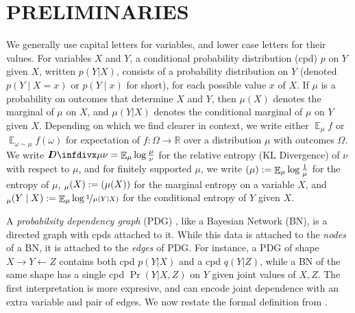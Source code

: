\documentclass[twoside]{article}
\theoremstyle{plain}
\theoremstyle{definition}
\let\H\relax
\DeclareMathOperator{\H}{\mathrm{H}} %
\DeclareMathOperator*{\Ex}{\mathbb{E}} %
\newcommand{\thickD}{I\mkern-8muD}
\newcommand{\kldiv}{\thickD\infdivx}
\newcommand{\ed}[3]{%
		\mathchoice%
		{#2\overset{\smash{\mskip-5mu\raisebox{-3pt}{${#1}$}}}{\xrightarrow{\hphantom{\scriptstyle {#1}}}} #3} %
		{#2\overset{\smash{\mskip-5mu\raisebox{-3pt}{$\scriptstyle {#1}$}}}{\xrightarrow{\hphantom{\scriptstyle {#1}}}} #3}%
		{#2\overset{\smash{\mskip-5mu\raisebox{-3pt}{$\scriptscriptstyle {#1}$}}}{\xrightarrow{\hphantom{\scriptscriptstyle {#1}}}} #3} %
		{#2\overset{\smash{\mskip-5mu\raisebox{-3pt}{$\scriptscriptstyle {#1}$}}}{\xrightarrow{\hphantom{\scriptscriptstyle {#1}}}} #3}} %
\begin{document}
\section{PRELIMINARIES}
We generally use capital letters for variables, and lower case letters for their values.
For variables $X$ and $Y$, a conditional probability distribution (cpd) $p$ on $Y$ given $X$, written $p(Y|X)$, consists of a probability distribution on $Y$ (denoted $p(Y\mid X\!=\!x)$ or $p(Y\mid x)$ for short), for each possible value $x$ of $X$.
If $\mu$ is a probability on outcomes that determine $X$ and $Y$,
then $\mu(X)$ denotes the marginal of $\mu$ on $X$, and $\mu(Y|X)$
denotes the conditional marginal of $\mu$ on  $Y$ given $X$. 
Depending on which we find clearer in context, we write either $\Ex_\mu f$ or $\Ex_{\omega \sim \mu} f(\omega)$ for expectation of $f : \Omega \to \mathbb R$ over a distribution $\mu$ with outcomes $\Omega$.
We write $\kldiv\mu\nu = \Ex_\mu \log \frac{\mu}{\nu}$ for the relative entropy (KL Divergence) of $\nu$ with respect to $\mu$, and for finitely supported $\mu$, we write $\H(\mu) := \Ex_\mu \log\frac1\mu$ for the entropy of $\mu$, $\H_\mu(X):= \H(\mu(X))$ for the marginal entropy on a variable $X$, and $\H_\mu(Y \mid X):= \Ex_\mu \log \nicefrac1{\mu(Y|X)}$ for the conditional entropy of $Y$ given $X$.

A \emph{probabilsity dependency graph} (PDG)
\cite{richardson2020probabilistic}, like a Bayesian Network (BN), is a
directed graph with cpds attached to it. While this data is attached
to the \emph{nodes} of a BN, it is attached to the \emph{edges} of
PDG. 
For instance, a PDG of shape $X \to Y \leftarrow Z$ contains both cpd $p(Y | X)$ and a cpd $q(Y | Z)$, while a BN of the same shape has a single cpd $\Pr(Y | X,Z)$ on $Y$ given joint values of $X,Z$.
The first interpretation is more expresive, and can encode joint dependence with an extra variable and pair of edges.
We now restate the formal definition from \cite{richardson2020probabilistic}.
\end{document}
